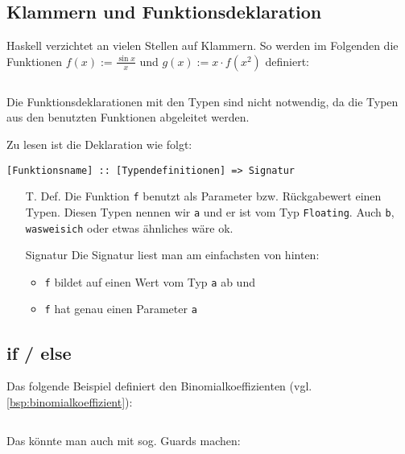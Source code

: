 \subsection{Klammern und Funktionsdeklaration}
Haskell verzichtet an vielen Stellen auf Klammern. So werden im
Folgenden die Funktionen $f(x) := \frac{\sin x}{x}$ und $g(x) := x \cdot f(x^2)$
definiert:

\inputminted[numbersep=5pt, tabsize=4]{haskell}{scripts/haskell/einfaches-beispiel-klammern.hs}

Die Funktionsdeklarationen mit den Typen sind nicht notwendig, da 
die Typen aus den benutzten Funktionen abgeleitet werden.

Zu lesen ist die Deklaration wie folgt:

\begin{center}
\texttt{[Funktionsname] :: \texttt{[Typendefinitionen]} => \texttt{Signatur}}
\end{center}

\begin{itemize}
    \item[T. Def.] Die Funktion \texttt{f} benutzt als Parameter bzw. Rückgabewert
          einen Typen. Diesen Typen nennen wir \texttt{a} und er ist
          vom Typ \texttt{Floating}. Auch \texttt{b}, \texttt{wasweisich}
          oder etwas ähnliches wäre ok.
    \item[Signatur] Die Signatur liest man am einfachsten von hinten:
        \begin{itemize}
            \item \texttt{f} bildet auf einen Wert vom Typ \texttt{a} ab und
            \item \texttt{f} hat genau einen Parameter \texttt{a}
        \end{itemize}
\end{itemize}


\subsection{if / else}
Das folgende Beispiel definiert den Binomialkoeffizienten (vgl. \cref{bsp:binomialkoeffizient}):

\inputminted[numbersep=5pt, tabsize=4]{haskell}{scripts/haskell/binomialkoeffizient.hs}

Das könnte man auch mit sog. Guards machen:

